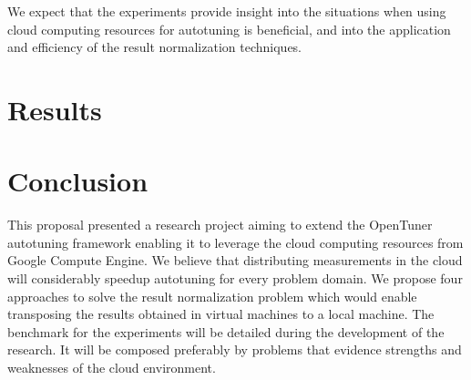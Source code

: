 \documentclass[a4paper, 12pt]{article}
\begin{document}
We expect that the experiments provide insight into the situations when using
cloud computing resources for autotuning is beneficial, and into the
application and efficiency of the result normalization techniques.

\section{Results} \label{sec:results}

\section{Conclusion} \label{sec:conclusion}

This proposal presented a research project aiming to extend the
OpenTuner autotuning framework enabling it to leverage the cloud computing
resources from Google Compute Engine. We believe that distributing
measurements in the cloud will considerably speedup autotuning for every
problem domain.
We propose four approaches to solve the result normalization problem
which would enable transposing the results obtained in virtual machines
to a local machine.
The benchmark for the experiments will be detailed during the development
of the research. It will be composed preferably by problems that evidence
strengths and weaknesses of the cloud environment.



\end{document}
